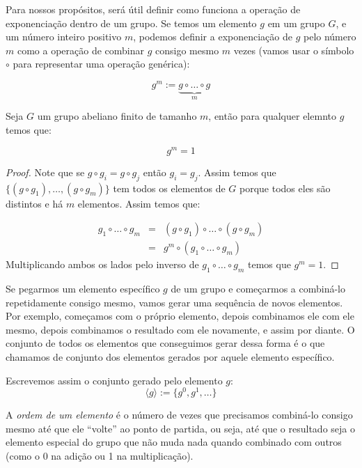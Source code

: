 Para nossos propósitos, será útil definir como funciona a operação de exponenciação dentro de um grupo.
Se temos um elemento $g$ em um grupo $G$, e um número inteiro positivo $m$, podemos definir a exponenciação de $g$ pelo número $m$ como a operação de combinar $g$ consigo mesmo $m$ vezes (vamos usar o símbolo $\circ$ para representar uma operação genérica):

\begin{displaymath}
  g^m := \underbrace{g \circ \dots \circ g}_m
\end{displaymath}


\begin{theorem}[Euller]
\label{theo:gen-euler}
Seja $G$ um grupo abeliano finito de tamanho $m$, então para qualquer elemnto $g$ temos que:

\begin{displaymath}
  g^m = 1
\end{displaymath}
\end{theorem}
\begin{proof}
  Note que se $g \circ g_i = g \circ g_j$ então $g_i = g_j$.
  Assim temos que $\{(g \circ g_1), \dots, (g \circ g_m)\}$ tem todos os elementos de $G$ porque todos eles são distintos e há $m$ elementos.
  Assim temos que:

  \begin{eqnarray*}
    g_1 \circ \dots \circ g_m & = & (g \circ g_1) \circ \dots \circ (g \circ g_m)\\
                              & = & g^m \circ (g_1 \circ \dots \circ g_m)
  \end{eqnarray*}
  Multiplicando ambos os lados pelo inverso de $g_1 \circ \dots \circ g_m$ temos que $g^m = 1$.
\end{proof}

Se pegarmos um elemento específico $g$ de um grupo e começarmos a combiná-lo repetidamente consigo mesmo, vamos gerar uma sequência de novos elementos.
Por exemplo, começamos com o próprio elemento, depois combinamos ele com ele mesmo, depois combinamos o resultado com ele novamente, e assim por diante.
O conjunto de todos os elementos que conseguimos gerar dessa forma é o que chamamos de conjunto dos elementos gerados por aquele elemento específico.

Escrevemos assim o conjunto gerado pelo elemento $g$:
\begin{displaymath}
  \langle g \rangle := \{g^0, g^1, \dots \}
\end{displaymath}

A {\em ordem de um elemento} é o número de vezes que precisamos combiná-lo consigo mesmo até que ele ``volte'' ao ponto de partida, ou seja, até que o resultado seja o elemento especial do grupo que não muda nada quando combinado com outros (como o 0 na adição ou 1 na multiplicação).

